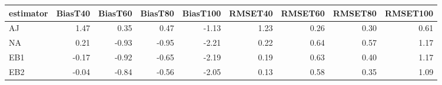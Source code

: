 \begin{table}[ht]
\centering
\begin{tabular}{lrrrrrrrr}
  \toprule
estimator & BiasT40 & BiasT60 & BiasT80 & BiasT100 & RMSET40 & RMSET60 & RMSET80 & RMSET100 \\ 
  \midrule
AJ & 1.47 & 0.35 & 0.47 & -1.13 & 1.23 & 0.26 & 0.30 & 0.61 \\ 
  NA & 0.21 & -0.93 & -0.95 & -2.21 & 0.22 & 0.64 & 0.57 & 1.17 \\ 
  EB1 & -0.17 & -0.92 & -0.65 & -2.19 & 0.19 & 0.63 & 0.40 & 1.17 \\ 
  EB2 & -0.04 & -0.84 & -0.56 & -2.05 & 0.13 & 0.58 & 0.35 & 1.09 \\ 
   \bottomrule
\end{tabular}
\end{table}
